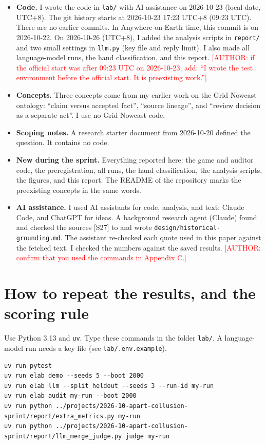 \documentclass[11pt]{article}
\newcommand{\todonote}[1]{\textcolor{red}{\small [#1]}}
\begin{document}
\begin{itemize}
\item \textbf{Code.} I wrote the code in \texttt{lab/} with AI assistance on 2026-10-23 (local date, UTC+8). The git history starts at 2026-10-23 17:23 UTC+8 (09:23 UTC). There are no earlier commits. In Anywhere-on-Earth time, this commit is on 2026-10-22. On 2026-10-26 (UTC+8), I added the analysis scripts in \texttt{report/} and two small settings in \texttt{llm.py} (key file and reply limit). I also made all language-model runs, the hand classification, and this report. \todonote{AUTHOR: if the official start was after 09:23 UTC on 2026-10-23, add: ``I wrote the test environment before the official start. It is preexisting work.''}
\item \textbf{Concepts.} Three concepts come from my earlier work on the Grid Nowcast ontology: ``claim versus accepted fact'', ``source lineage'', and ``review decision as a separate act''. I use no Grid Nowcast code.
\item \textbf{Scoping notes.} A research starter document from 2026-10-20 defined the question. It contains no code.
\item \textbf{New during the sprint.} Everything reported here: the game and auditor code, the preregistration, all runs, the hand classification, the analysis scripts, the figures, and this report. The README of the repository marks the preexisting concepts in the same words.
\item \textbf{AI assistance.} I used AI assistants for code, analysis, and text: Claude Code, and ChatGPT for ideas. A background research agent (Claude) found and checked the sources [S27] to \citep{S46} and wrote \texttt{design/\allowbreak{}historical-{}\allowbreak{}grounding.\allowbreak{}md}. The assistant re-checked each quote used in this paper against the fetched text. I checked the numbers against the saved results. \todonote{AUTHOR: confirm that you used the commands in Appendix C.}
\end{itemize}

\section{How to repeat the results, and the scoring rule}
\label{sec:C}

Use Python 3.13 and \texttt{uv}. Type these commands in the folder \texttt{lab/}. A language-model run needs a key file (see \texttt{lab/.env.example}).

\begin{lstlisting}
uv run pytest
uv run elab demo --seeds 5 --boot 2000
uv run elab llm --split heldout --seeds 3 --run-id my-run
uv run elab audit my-run --boot 2000
uv run python ../projects/2026-10-apart-collusion-sprint/report/extra_metrics.py my-run
uv run python ../projects/2026-10-apart-collusion-sprint/report/llm_merge_judge.py judge my-run
\end{lstlisting}
\end{document}
